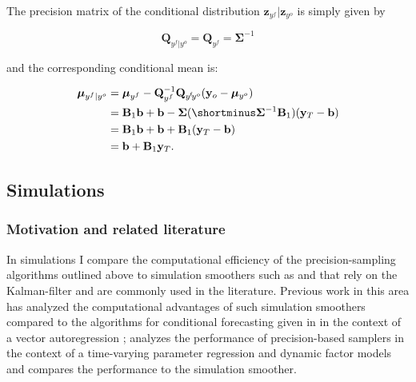 \documentclass[notitlepage,a4paper,12pt]{article}
\begin{document}
The precision matrix of the conditional distribution $\mathbf{z}_{y^f}|\mathbf{z}_{y^o}$ is simply given by

\begin{equation*}
    \mathbf{Q}_{y^f|y^o} = 
    \mathbf{Q}_{y^f} = 
    \boldsymbol{\Sigma}^{-1}
\end{equation*}

and the corresponding conditional mean is:

\begin{align*}
    \boldsymbol{\mu}_{y^f|y^o} &= 
    \boldsymbol{\mu}_{y^f} - \mathbf{Q}_{y^f}^{-1} \mathbf{Q}_{y^{\sf{f}}\!y^o} (\mathbf{y}_o - \boldsymbol{\mu}_{y^o})\\
    &= \mathbf{B}_1\mathbf{b} + \mathbf{b} - \boldsymbol{\Sigma} (\shortminus\boldsymbol{\Sigma}^{-1} \mathbf{B}_1) (\mathbf{y}_T - \mathbf{b}) \\
    &= \mathbf{B}_1\mathbf{b} + \mathbf{b} + \mathbf{B}_1 (\mathbf{y}_T - \mathbf{b}) \\
    &= \mathbf{b} + \mathbf{B}_1 \mathbf{y}_T.
\end{align*}


\subsection{Simulations}

\subsubsection{Motivation and related literature}

In simulations I compare the computational efficiency of the precision-sampling algorithms outlined above to  simulation smoothers such as \citet{carterkohn1994_biomtr} and \citet{durbinkoopman2002_biomtr} that rely on the Kalman-filter and are commonly used in the literature. Previous work in this area has analyzed the computational advantages of such simulation smoothers compared to the algorithms for conditional forecasting given in \citet{waggonerzha1999_res} in the context of a vector autoregression \citep{bgl_2015ijf}; \citet{mmp2011_csda} analyzes the performance of precision-based samplers in the context of a time-varying parameter regression and dynamic factor models and compares the performance to the \citet{durbinkoopman2002_biomtr} simulation smoother.\\
\end{document}
